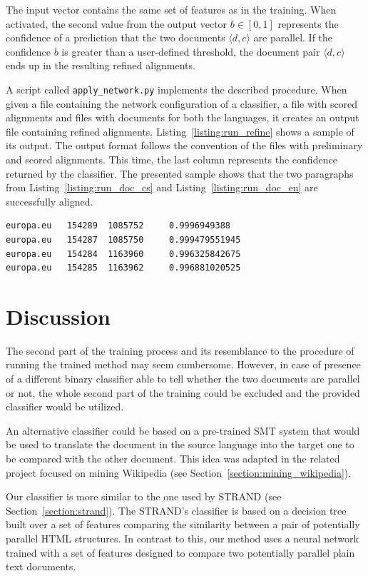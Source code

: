 The input vector contains the same set of features as in the training. When activated, the second value from the output vector $b \in [0, 1]$ represents the confidence of a prediction that the two documents $\langle d,c \rangle$ are parallel. If the confidence $b$ is greater than a user-defined threshold, the document pair $\langle d,c \rangle$ ends up in the resulting refined alignments.

A script called \texttt{apply\_network.py} implements the described procedure. When given a file containing the network configuration of a classifier, a file with scored alignments and files with documents for both the languages, it creates an output file containing refined alignments. Listing~\ref{listing:run_refine} shows a sample of its output. The output format follows the convention of the files with preliminary and scored alignments. This time, the last column represents the confidence returned by the classifier. The presented sample shows that the two paragraphs from Listing~\ref{listing:run_doc_cs} and Listing~\ref{listing:run_doc_en} are successfully aligned.

\begin{lstlisting}[float=!htb,caption={Sample from a file with refined alignments (running)},label={listing:run_refine},firstnumber=33683]
europa.eu	154289	1085752		0.9996949388
europa.eu	154287	1085750		0.999479551945
europa.eu	154284	1163960		0.996325842675
europa.eu	154285	1163962		0.996881020525
\end{lstlisting}
\section{Discussion}
\label{section:method_discussion}

The second part of the training process and its resemblance to the procedure of running the trained method may seem cumbersome. However, in case of presence of a different binary classifier able to tell whether the two documents are parallel or not, the whole second part of the training could be excluded and the provided classifier would be utilized.

An alternative classifier could be based on a pre-trained SMT system that would be used to translate the document in the source language into the target one to be compared with the other document. This idea was adapted in the related project focused on mining Wikipedia (see Section~\ref{section:mining_wikipedia}).

Our classifier is more similar to the one used by STRAND (see Section~\ref{section:strand}). The STRAND's classifier is based on a decision tree built over a set of features comparing the similarity between a pair of potentially parallel HTML structures. In contrast to this, our method uses a neural network trained with a set of features designed to compare two potentially parallel plain text documents.

